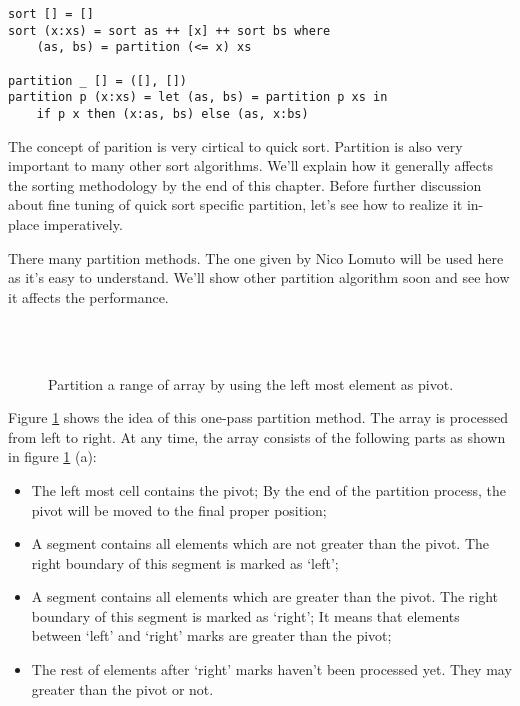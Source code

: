 \documentclass{article}
\begin{document}
\lstset{language=Haskell}
\begin{lstlisting}
sort [] = []
sort (x:xs) = sort as ++ [x] ++ sort bs where
    (as, bs) = partition (<= x) xs

partition _ [] = ([], [])
partition p (x:xs) = let (as, bs) = partition p xs in
    if p x then (x:as, bs) else (as, x:bs)
\end{lstlisting}

The concept of parition is very cirtical to quick sort. Partition is also very important to many
other sort algorithms. We'll explain how it generally affects the sorting methodology by the end
of this chapter. Before further discussion about fine tuning of quick sort specific partition, let's
see how to realize it in-place imperatively.

There many partition methods. The one given by Nico Lomuto \cite{pearls} \cite{CLRS} will be used here as it's
easy to understand. We'll show other partition algorithm soon and see how it affects the performance.

\begin{figure}[htbp]
   \centering
    \\
    \\
   \caption{Partition a range of array by using the left most element as pivot.} 
   \label{fig:partition-1-way}
\end{figure}

Figure \ref{fig:partition-1-way} shows the idea of this one-pass partition method. The array is processed from
left to right. At any time, the array consists of the following parts as shown in figure \ref{fig:partition-1-way} (a): 

\begin{itemize}
\item The left most cell contains the pivot; By the end of the partition process, the pivot will be moved to the 
final proper position;
\item A segment contains all elements which are not greater than the pivot. The right boundary of this segment is
marked as `left';
\item A segment contains all elements which are greater than the pivot. The right boundary of this segment is marked
as `right'; It means that elements between `left' and `right' marks are greater than the pivot;
\item The rest of elements after `right' marks haven't been processed yet. They may greater than the
pivot or not.
\end{itemize}
\end{document}
